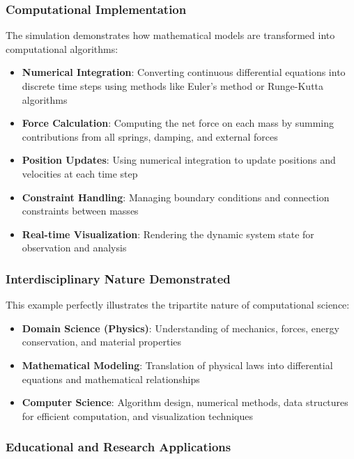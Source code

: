 \subsubsection{Computational Implementation}

The simulation demonstrates how mathematical models are transformed into computational algorithms:

\begin{itemize}
  \item \textbf{Numerical Integration}: Converting continuous differential equations into discrete time steps using methods like Euler's method or Runge-Kutta algorithms
  \item \textbf{Force Calculation}: Computing the net force on each mass by summing contributions from all springs, damping, and external forces
  \item \textbf{Position Updates}: Using numerical integration to update positions and velocities at each time step
  \item \textbf{Constraint Handling}: Managing boundary conditions and connection constraints between masses
  \item \textbf{Real-time Visualization}: Rendering the dynamic system state for observation and analysis
\end{itemize}

\subsubsection{Interdisciplinary Nature Demonstrated}

This example perfectly illustrates the tripartite nature of computational science:

\begin{itemize}
  \item \textbf{Domain Science (Physics)}: Understanding of mechanics, forces, energy conservation, and material properties
  \item \textbf{Mathematical Modeling}: Translation of physical laws into differential equations and mathematical relationships
  \item \textbf{Computer Science}: Algorithm design, numerical methods, data structures for efficient computation, and visualization techniques
\end{itemize}

\subsubsection{Educational and Research Applications}

